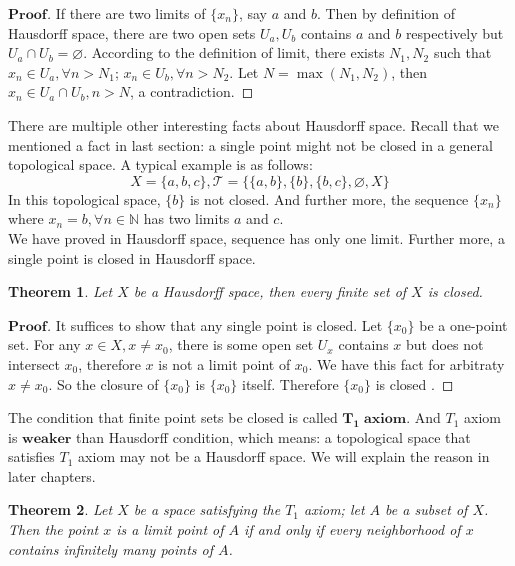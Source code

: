 \documentclass[a4paper, 11pt]{article}
\newtheorem{theorem}{Theorem}
\theoremstyle{definition}
\theoremstyle{remark}
\newenvironment{myprf}
{\renewcommand\qedsymbol{$ $}\begin{proof}[$\mathbf{Proof}$]}
  {\end{proof}}
\theoremstyle{definition}
\begin{document}
\begin{myprf}
        If there are two limits of $\{x_n\}$, say $a$ and $b$. Then by definition
        of Hausdorff space, there are two open sets $U_a,U_b$ contains $a$ and $b$
        respectively but $U_a\cap U_b=\varnothing$. According to the definition
        of limit, there exists $N_1,N_2$ such that $x_n\in U_a,\forall n>N_1$;
        $x_n\in U_b, \forall n>N_2$. Let $N=\max(N_1,N_2)$, then $x_n
        \in U_a\cap U_b, n>N$, a contradiction.
\end{myprf}
There are multiple other interesting facts about Hausdorff space. Recall that we
mentioned a fact in last section: a single point might not be closed in a general
topological space. A typical example is as follows:
$$
X=\{a,b,c\}, \mathcal{T}=\{\{a,b\},\{b\},\{b,c\},\varnothing,X\}
$$
In this topological space, $\{b\}$ is not closed. And further more, the sequence
$\{x_n\}$ where $x_n=b,\forall n\in \mathbb{N}$ has two limits $a$ and $c$.\\
\indent
We have proved in Hausdorff space, sequence has only one limit. Further more, a
single point is closed in Hausdorff space.
\begin{theorem}
       Let $X$ be a Hausdorff space, then every finite set of $X$ is closed.
\end{theorem}
\begin{myprf}
        It suffices to show that any single point is closed. Let $\{x_0\}$ be a
        one-point set. For any $x\in X,x\neq x_0$, there is some open set
        $U_x$ contains $x$ but does not intersect $x_0$, therefore $x$ is not 
        a limit point of $x_0$. We have this fact for arbitraty $x\neq x_0$. So
        the closure of $\{x_0\}$ is $\{x_0\}$ itself. Therefore $\{x_0\}$ is closed
        .
\end{myprf}
The condition that finite point sets be closed is called $\mathbf{T_1\;axiom}$. 
And $T_1$ axiom is $\textbf{weaker}$ than Hausdorff condition, which means: a topological 
space that satisfies $T_1$ axiom may not be a Hausdorff space. We will explain
the reason in later chapters.
\vspace{0.5cm}
\begin{theorem}
      Let $X$ be a space satisfying the $T_1$ axiom; let $A$ be a subset of $X$.
      Then the point $x$ is a limit point of $A$ if and only if
      every neighborhood of $x$
      contains infinitely many points of $A$.
\end{theorem}
\end{document}
